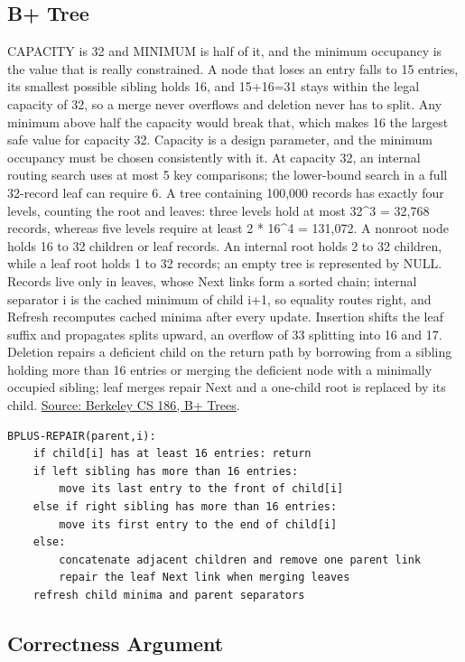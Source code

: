 \subsection{B+ Tree}

CAPACITY is 32 and MINIMUM is half of it, and the minimum occupancy is the value that is really constrained. A node that loses an entry falls to 15 entries, its smallest possible sibling holds 16, and 15+16=31 stays within the legal capacity of 32, so a merge never overflows and deletion never has to split. Any minimum above half the capacity would break that, which makes 16 the largest safe value for capacity 32. Capacity is a design parameter, and the minimum occupancy must be chosen consistently with it. At capacity 32, an internal routing search uses at most 5 key comparisons; the lower-bound search in a full 32-record leaf can require 6. A tree containing 100,000 records has exactly four levels, counting the root and leaves: three levels hold at most 32\textasciicircum{}3 = 32,768 records, whereas five levels require at least 2 * 16\textasciicircum{}4 = 131,072. A nonroot node holds 16 to 32 children or leaf records. An internal root holds 2 to 32 children, while a leaf root holds 1 to 32 records; an empty tree is represented by NULL. Records live only in leaves, whose Next links form a sorted chain; internal separator i is the cached minimum of child i+1, so equality routes right, and Refresh recomputes cached minima after every update. Insertion shifts the leaf suffix and propagates splits upward, an overflow of 33 splitting into 16 and 17. Deletion repairs a deficient child on the return path by borrowing from a sibling holding more than 16 entries or merging the deficient node with a minimally occupied sibling; leaf merges repair Next and a one-child root is replaced by its child. \href{https://cs186berkeley.net/notes/note4/}{Source: Berkeley CS 186, B+ Trees}.

\begin{lstlisting}[language={},numbers=none]
BPLUS-REPAIR(parent,i):
    if child[i] has at least 16 entries: return
    if left sibling has more than 16 entries:
        move its last entry to the front of child[i]
    else if right sibling has more than 16 entries:
        move its first entry to the end of child[i]
    else:
        concatenate adjacent children and remove one parent link
        repair the leaf Next link when merging leaves
    refresh child minima and parent separators
\end{lstlisting}

\subsection{Correctness Argument}

